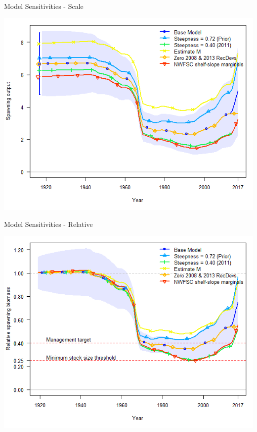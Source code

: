 \documentclass[pdf]{beamer}\usepackage[]{graphicx}\usepackage[]{color}
\begin{document}
\begin{frame}{Model Sensitivities - Scale}
  \begin{center}
    \includegraphics[scale = 0.40]{figures/SSB_sensitivities_1.png}
  \end{center}
\end{frame}

\begin{frame}{Model Sensitivities - Relative}
  \begin{center}
    \includegraphics[scale = 0.40]{figures/Bratio_sensitivites_1.png}
  \end{center}
\end{frame}
\end{document}
